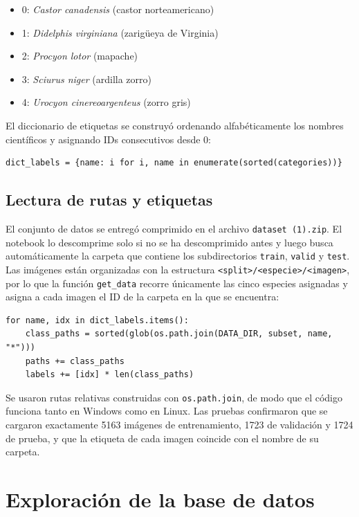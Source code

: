 \documentclass[11pt]{article}
\begin{document}
\begin{itemize}
  \item 0: \emph{Castor canadensis} (castor norteamericano)
  \item 1: \emph{Didelphis virginiana} (zarigüeya de Virginia)
  \item 2: \emph{Procyon lotor} (mapache)
  \item 3: \emph{Sciurus niger} (ardilla zorro)
  \item 4: \emph{Urocyon cinereoargenteus} (zorro gris)
\end{itemize}

El diccionario de etiquetas se construyó ordenando alfabéticamente los nombres científicos y asignando IDs consecutivos desde 0:

\begin{lstlisting}
dict_labels = {name: i for i, name in enumerate(sorted(categories))}
\end{lstlisting}

\subsection{Lectura de rutas y etiquetas}

El conjunto de datos se entregó comprimido en el archivo \texttt{dataset (1).zip}. El notebook lo descomprime solo si no se ha descomprimido antes y luego busca automáticamente la carpeta que contiene los subdirectorios \texttt{train}, \texttt{valid} y \texttt{test}. Las imágenes están organizadas con la estructura \texttt{<split>/<especie>/<imagen>}, por lo que la función \texttt{get\_data} recorre únicamente las cinco especies asignadas y asigna a cada imagen el ID de la carpeta en la que se encuentra:

\begin{lstlisting}
for name, idx in dict_labels.items():
    class_paths = sorted(glob(os.path.join(DATA_DIR, subset, name, "*")))
    paths += class_paths
    labels += [idx] * len(class_paths)
\end{lstlisting}

Se usaron rutas relativas construidas con \texttt{os.path.join}, de modo que el código funciona tanto en Windows como en Linux. Las pruebas confirmaron que se cargaron exactamente 5163 imágenes de entrenamiento, 1723 de validación y 1724 de prueba, y que la etiqueta de cada imagen coincide con el nombre de su carpeta.

\section{Exploración de la base de datos}
\end{document}
